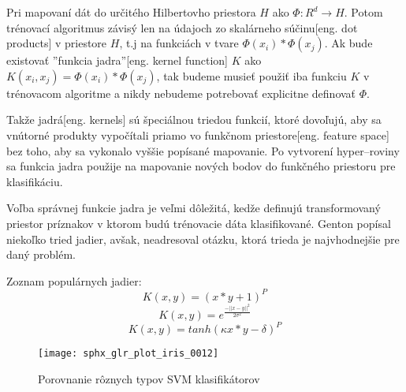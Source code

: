 Pri mapovaní dát do určitého Hilbertovho priestora \cite{prop:HilbertSpace} $H$ ako $\Phi:R^d \rightarrow H$.
Potom trénovací algoritmus závisý len na údajoch zo skalárneho súčinu[eng. dot products] v priestore $H$, t.j na funkciách v tvare $\Phi(x_i) * \Phi(x_j)$.
Ak bude existovať ''funkcia jadra''[eng. kernel function] $K$ ako $K(x_i, x_j) = \Phi(x_i)*\Phi(x_j)$, tak budeme musieť použiť iba funkciu $K$ v trénovacom algoritme
    a nikdy nebudeme potrebovať explicitne definovať $\Phi$\cite{prop:SupervisedMachineLearning}.

Takže jadrá[eng. kernels] sú špeciálnou triedou funkcií, ktoré dovoľujú, aby sa vnútorné produkty vypočítali priamo vo funkčnom priestore[eng. feature space] bez toho, aby sa vykonalo vyššie popísané mapovanie.
Po vytvorení hyper--roviny sa funkcia jadra použije na mapovanie nových bodov do funkčného priestoru pre klasifikáciu\cite{prop:SupervisedMachineLearning}.

Voľba správnej funkcie jadra je veľmi dôležitá, kedže definujú transformovaný priestor príznakov v ktorom budú trénovacie dáta klasifikované.
Genton \cite{prop:KernelClasses} popísal niekoľko tried jadier, avšak, neadresoval otázku, ktorá trieda je najvhodnejšie pre daný problém.

Zoznam populárnych jadier\cite{prop:SupervisedMachineLearning}:
\begin{equation}
    K(x, y) = (x*y+1)^P
\end{equation}
\begin{equation}
    K(x, y) = e^{\frac{-||x-y||^2}{2 \sigma^2}}
\end{equation}
\begin{equation}
    K(x, y) = tanh(\kappa x*y - \delta)^P
\end{equation}

\begin{figure}[H]
	\centering
	\texttt{[image: sphx\_glr\_plot\_iris\_0012]}
	\caption{Porovnanie rôznych typov SVM klasifikátorov\cite{odkaz:SVMImage}}
	\label{pic:SVMComparison}
\end{figure}



